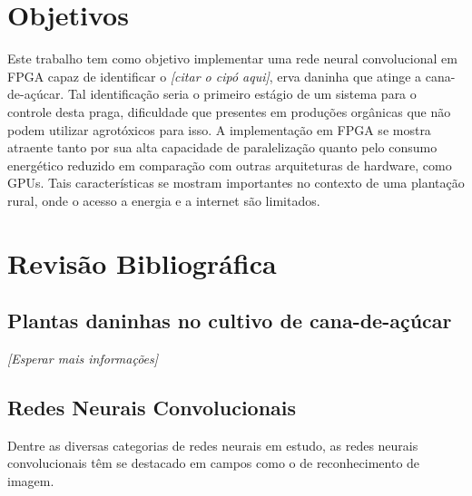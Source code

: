 \documentclass[
	12pt,				%
	oneside,			%
	a4paper,			%
	english,			%
	french,				%
	spanish,			%
	brazil,				%
	]{abntex2}
\begin{document}
    
\chapter*[Objetivos]{Objetivos}
 Este trabalho tem como objetivo implementar uma rede neural convolucional em FPGA capaz de identificar o \textit{[citar o cipó aqui]}, erva daninha que atinge a cana-de-açúcar. Tal identificação seria o primeiro estágio de um sistema para o controle desta praga, dificuldade que presentes em produções orgânicas que não podem utilizar agrotóxicos para isso. A implementação em FPGA se mostra atraente tanto por sua alta capacidade de paralelização quanto pelo consumo energético reduzido em comparação com outras arquiteturas de hardware, como GPUs. Tais características se mostram importantes no contexto de uma plantação rural, onde o acesso a energia e a internet são limitados.

\chapter*[Revisão Bibliográfica]{Revisão Bibliográfica}

\section*{Plantas daninhas no cultivo de cana-de-açúcar}
\textit{[Esperar mais informações]}

\section*{Redes Neurais Convolucionais}
Dentre as diversas categorias de redes neurais em estudo, as redes neurais convolucionais têm se destacado em campos como o de reconhecimento de imagem.
\end{document}
